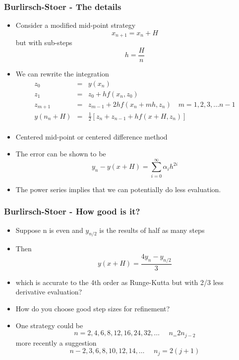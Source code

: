 \documentclass[10pt]{beamer}
\begin{document}
\begin{frame}
  \frametitle{Burlirsch-Stoer - The details}
  \begin{itemize}
  \item Consider a modified mid-point strategy
    \[
      x_{n+1} = x_n + H
    \] but with sub-steps
    \[
      h = \frac{H}{n}
    \]
  \item We can rewrite the integration
    \[
      \begin{array}{rcl}
        z_0 & = & y(x_n)\\
        z_1 & = & z_0 + h f( x_n, z_0 )\\
        z_{m+1} & = & z_{m-1} + 2h f(x_{n} + mh, z_n) \mbox{~~~} m = 1, 2, 3, ...{n-1}\\
        y(n_n + H) & = & \frac{1}{2} [ z_n + z_{n-1} + h f(x+H, z_n) ] \\ 
      \end{array}
    \]
  \item Centered mid-point or centered difference method
  \item The error can be shown to be
    \[
      y_n - y(x+H) = \sum_{i=0}^{\infty} \alpha_i h^{2i}
    \]
  \item The power series implies that we can potentially do less evaluation. 
  \end{itemize}
\end{frame}

\begin{frame}
  \frametitle{Burlirsch-Stoer - How good is it? }
  \begin{itemize}
  \item Suppose n is even and $y_{n/2}$ is the results of half as many steps    
  \item Then
    \[
      y(x+H) = \frac{4 y_n - y_{n/2}}{3}
    \]
  \item which is accurate to the 4th order as Runge-Kutta but with
    2/3 less derivative evaluation? 
  \item How do you choose good step sizes for refinement? \pause
  \item One strategy could be
    \[
      n = 2, 4, 6, 8, 12, 16, 24, 32, \ldots \mbox{~~~~} n_ = 2 n_{j-2}
    \]
    more recently a suggestion
    \[
      n - 2, 3, 6, 8, 10, 12, 14, \ldots \mbox{~~~~} n_j = 2(j+1)
    \]
  \end{itemize}  
\end{frame}
\end{document}
